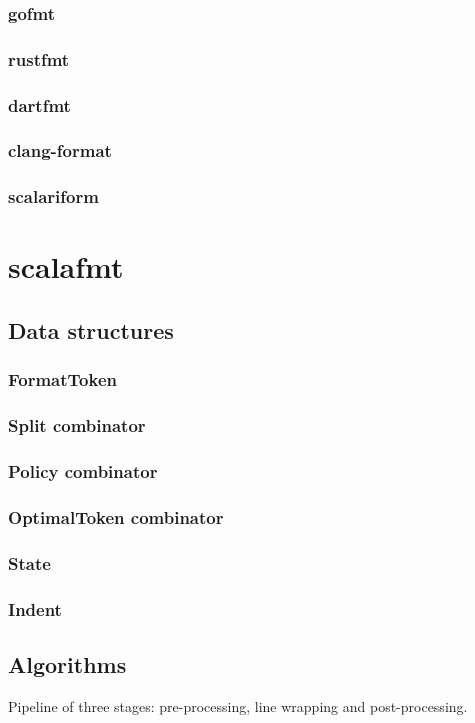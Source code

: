 \documentclass[11pt,a4paper]{article}
\begin{document}
\subsubsection{gofmt}
\subsubsection{rustfmt}
\subsubsection{dartfmt}
\subsubsection{clang-format}
\subsubsection{scalariform}
\section{scalafmt}
\subsection{Data structures}
\subsubsection{FormatToken}
\subsubsection{Split combinator}
\subsubsection{Policy combinator}
\subsubsection{OptimalToken combinator}
\subsubsection{State}
\subsubsection{Indent}
\subsection{Algorithms}
Pipeline of three stages: pre-processing, line wrapping and post-processing.
\end{document}
